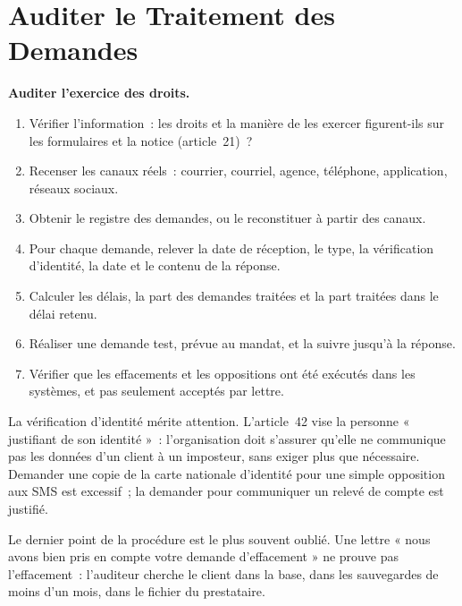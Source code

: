 \section{Auditer le Traitement des Demandes}
\label{sec:c06-auditer}

\begin{boxprocedure}
\textbf{Auditer l'exercice des droits.}
\begin{enumerate}
    \item Vérifier l'information~: les droits et la manière de les exercer
          figurent-ils sur les formulaires et la notice (article~21)~?
    \item Recenser les canaux réels~: courrier, courriel, agence, téléphone,
          application, réseaux sociaux.
    \item Obtenir le registre des demandes, ou le reconstituer à partir des
          canaux.
    \item Pour chaque demande, relever la date de réception, le type, la
          vérification d'identité, la date et le contenu de la réponse.
    \item Calculer les délais, la part des demandes traitées et la part
          traitées dans le délai retenu.
    \item Réaliser une demande test, prévue au mandat, et la suivre jusqu'à
          la réponse.
    \item Vérifier que les effacements et les oppositions ont été exécutés
          dans les systèmes, et pas seulement acceptés par lettre.
\end{enumerate}
\end{boxprocedure}

La vérification d'identité mérite attention. L'article~42 vise la personne
« justifiant de son identité »~: l'organisation doit s'assurer qu'elle ne
communique pas les données d'un client à un imposteur, sans exiger plus que
nécessaire. Demander une copie de la carte nationale d'identité pour une
simple opposition aux SMS est excessif~; la demander pour communiquer un
relevé de compte est justifié.

Le dernier point de la procédure est le plus souvent oublié. Une lettre
« nous avons bien pris en compte votre demande d'effacement » ne prouve pas
l'effacement~: l'auditeur cherche le client dans la base, dans les
sauvegardes de moins d'un mois, dans le fichier du prestataire.

